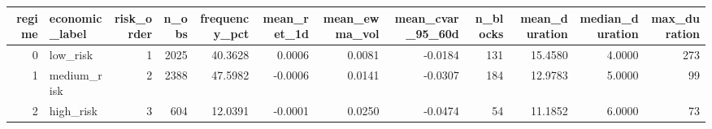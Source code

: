\begin{tabular}{rlrrrrrrrrrr}
\toprule
regime & economic_label & risk_order & n_obs & frequency_pct & mean_ret_1d & mean_ewma_vol & mean_cvar_95_60d & n_blocks & mean_duration & median_duration & max_duration \\
\midrule
0 & low_risk & 1 & 2025 & 40.3628 & 0.0006 & 0.0081 & -0.0184 & 131 & 15.4580 & 4.0000 & 273 \\
1 & medium_risk & 2 & 2388 & 47.5982 & -0.0006 & 0.0141 & -0.0307 & 184 & 12.9783 & 5.0000 & 99 \\
2 & high_risk & 3 & 604 & 12.0391 & -0.0001 & 0.0250 & -0.0474 & 54 & 11.1852 & 6.0000 & 73 \\
\bottomrule
\end{tabular}

